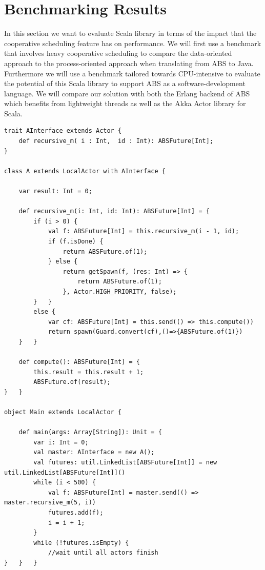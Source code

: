 \section{Benchmarking Results}
\label{bench}

In this section we want to evaluate Scala library in terms of the impact that the cooperative scheduling feature has on performance. We will first use a benchmark that involves heavy cooperative scheduling to compare the data-oriented approach to the process-oriented approach when translating from ABS to Java. Furthermore we will use a benchmark tailored towards CPU-intensive to evaluate the potential of this Scala library to support ABS as a software-development language. We will compare our solution with both the Erlang backend of ABS which benefits from lightweight threads as well as the Akka Actor library for Scala.

\begin{lstlisting}[caption= Benchmark Example, label=absex]
trait AInterface extends Actor {
	def recursive_m( i : Int,  id : Int): ABSFuture[Int];
}

class A extends LocalActor with AInterface {

	var result: Int = 0;
	
	def recursive_m(i: Int, id: Int): ABSFuture[Int] = {
		if (i > 0) {
			val f: ABSFuture[Int] = this.recursive_m(i - 1, id);
			if (f.isDone) {
				return ABSFuture.of(1);
			} else {
				return getSpawn(f, (res: Int) => {
					return ABSFuture.of(1);
				}, Actor.HIGH_PRIORITY, false);
		}	}
		else {
			var cf: ABSFuture[Int] = this.send(() => this.compute())
			return spawn(Guard.convert(cf),()=>{ABSFuture.of(1)})
	}	}
	
	def compute(): ABSFuture[Int] = {
		this.result = this.result + 1;
		ABSFuture.of(result);
}	}

object Main extends LocalActor {

	def main(args: Array[String]): Unit = {
		var i: Int = 0;
		val master: AInterface = new A();
		val futures: util.LinkedList[ABSFuture[Int]] = new util.LinkedList[ABSFuture[Int]]()
		while (i < 500) {
			val f: ABSFuture[Int] = master.send(() => master.recursive_m(5, i))
			futures.add(f);
			i = i + 1;
		}
		while (!futures.isEmpty) {
			//wait until all actors finish
}	}	}
\end{lstlisting}

